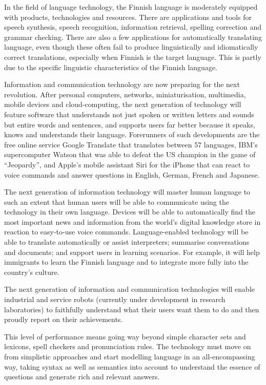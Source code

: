 \begin{multicols}{2}
In the field of language technology, the Finnish language is moderately equipped with products, technologies and resources. There are applications and tools for speech synthesis, speech recognition, information retrieval, spelling correction and grammar checking. There are also a few applications for automatically translating language, even though these often fail to produce linguistically and idiomatically correct translations, especially when Finnish is the target language. This is partly due to the specific linguistic characteristics of the Finnish language.

Information and communication technology are now preparing for the next revolution. After personal computers, networks, miniaturisation, multimedia, mobile devices and cloud-computing, the next generation of technology will feature software that understands not just spoken or written letters and sounds but entire words and sentences, and supports users far better because it speaks, knows and understands their language. Forerunners of such developments are the free online service Google Translate that translates between 57 languages, IBM’s supercomputer Watson that was able to defeat the US champion in the game of “Jeopardy”, and Apple’s mobile assistant Siri for the iPhone that can react to voice commands and answer questions in English, German, French and Japanese. 

The next generation of information technology will master human language to such an extent that human users will be able to communicate using the technology in their own language. Devices will be able to automatically find the most important news and information from the world’s digital knowledge store in reaction to easy-to-use voice commands. Language-enabled technology will be able to translate automatically or assist interpreters; summarise conversations and documents; and support users in learning scenarios. For example, it will help immigrants to learn the Finnish language and to integrate more fully into the country’s culture.

The next generation of information and communication technologies will enable industrial and service robots (currently under development in research laboratories) to faithfully understand what their users want them to do and then proudly report on their achievements.  

This level of performance means going way beyond simple character sets and lexicons, spell checkers and pronunciation rules. The technology must move on from simplistic approaches and start modelling language in an all-encompassing way, taking syntax as well as semantics into account to understand the essence of questions and generate rich and relevant answers.


\end{multicols}
